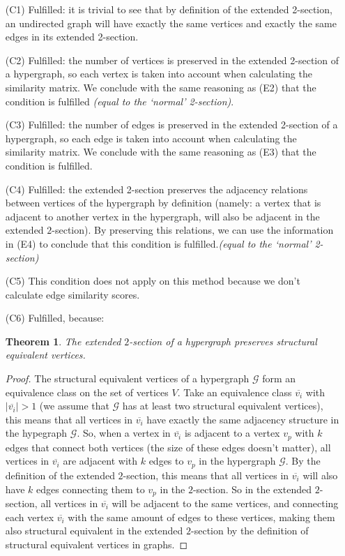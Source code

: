 \documentclass[a4paper,11pt]{report}
\newtheorem{theorem}{Theorem}[section]
\newcommand{\hgraf}{\mathcal{G}}
\begin{document}
\begin{itemize}
  \item[(C1)] Fulfilled: it is trivial to see that by definition of the extended 2-section, an undirected 
  graph will have exactly the same vertices and exactly the same edges in its
  extended 2-section.
    \item[(C2)] Fulfilled: the number of vertices is preserved in the extended 2-section of 
  a hypergraph, so each vertex is taken into account when calculating the 
  similarity matrix. We conclude with the same reasoning as (E2) that the 
  condition is fulfilled \textit{(equal to the `normal' 2-section)}.    
  \item[(C3)]  Fulfilled: the number of edges is preserved in the extended 2-section of 
  a hypergraph, so each edge is taken into account when calculating the 
  similarity matrix. We conclude with the same reasoning as (E3) that the 
  condition is fulfilled.
  \item[(C4)] Fulfilled: the extended 2-section preserves the adjacency relations between 
  vertices of the hypergraph by definition (namely: a vertex that is adjacent to another vertex in the hypergraph, will also be adjacent in the extended $2$-section). By preserving this relations, we can 
  use the information in (E4) to conclude that this condition is fulfilled.\textit{(equal to the `normal' 2-section)}
  \item[(C5)]   This condition does not apply on this method because we don't calculate edge similarity scores.

  \item[(C6)] Fulfilled, because:\begin{theorem}
   The extended $2$-section of a hypergraph preserves structural equivalent vertices.
  \end{theorem}
 \begin{proof}
   The structural equivalent vertices of a hypergraph $\hgraf$ form an equivalence class on the set of vertices
   $V$. Take an equivalence class $\overline{v_i}$ with $|\overline{v_i}| > 1$ (we assume that $\hgraf$ has at least two structural equivalent vertices),
   this means that all vertices in $\overline{v_i}$ have exactly the same adjacency structure in the hypegraph $\hgraf$.  
   So, when a vertex in $\overline{v_i}$ is adjacent to a vertex $v_p$ with $k$ edges that connect both vertices (the size of these
   edges doesn't matter), all 
   vertices in $\overline{v_i}$ are adjacent with $k$ edges to $v_p$ in the hypergraph 
   $\hgraf$. By the definition of the extended $2$-section, this means that all vertices 
   in $\overline{v_i}$ will also have $k$ edges connecting them to $v_p$ in the 
   $2$-section. So in the extended $2$-section, all vertices in $\overline{v_i}$ will be adjacent to 
  the same vertices, and connecting each vertex $\overline{v_i}$ with the same amount of edges to these vertices, making them also
   structural equivalent in the extended $2$-section by the definition of structural equivalent vertices in graphs.   
   

\end{proof}
\end{itemize}
\end{document}
